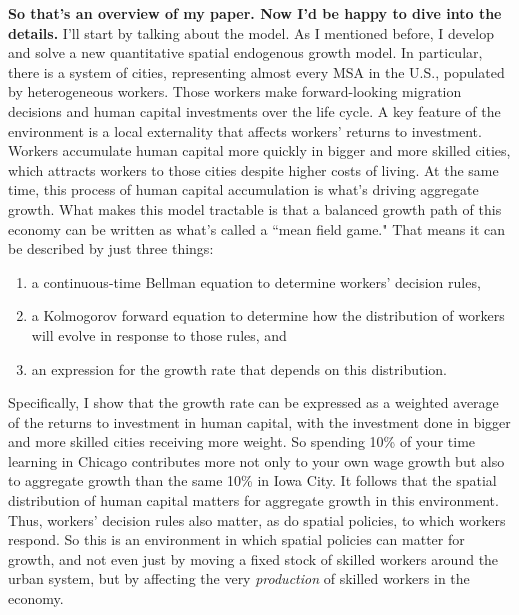 \documentclass{jmstatement}
\begin{document}
\textbf{So that's an overview of my paper. Now I'd be happy to dive into the details.}
I'll start by talking about the model.
As I mentioned before, I develop and solve a new quantitative spatial endogenous growth model.
In particular, there is a system of cities, representing almost every MSA in the U.S.,
populated by heterogeneous workers. Those workers make forward-looking
migration decisions and human capital investments over the life cycle.
A key feature of the environment is a local externality
that affects workers' returns to investment.
Workers accumulate human capital more quickly in bigger and more skilled
cities, which attracts workers to those cities despite higher costs of
living. At the same time, this process of human capital accumulation is
what's driving aggregate growth.
What makes this model tractable is that a balanced growth path of this economy can
be written as what's called a ``mean field game."
That means it can be described by just three things:
\vspace{-2ex}
\begin{enumerate}
    \item a continuous-time Bellman equation to determine workers' decision rules,
    \item a Kolmogorov forward equation to determine how the distribution of workers
    will evolve in response to those rules, and
    \item an expression for the growth rate that depends on this distribution.
\end{enumerate}
\vspace{-2ex}
Specifically, I show that the growth rate can be expressed as a
weighted average of the returns to investment in human capital, with the
investment done in bigger and more skilled cities receiving more weight.
So spending 10\% of your time learning in Chicago contributes more not only
to your own wage growth but also to aggregate growth than the same 10\% in Iowa City.
It follows that the spatial distribution of human capital matters
for aggregate growth in this environment.
Thus, workers' decision rules also matter, as do spatial policies, to which workers respond.
So this is an environment in which spatial policies can matter for growth, and
not even just by moving a fixed stock of skilled workers around the urban system,
but by affecting the very \textit{production} of skilled workers in the economy.
\end{document}
